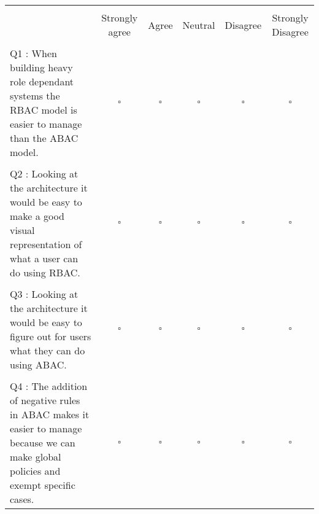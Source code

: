 \hskip-2.8cm\begin{tabular}{p{5cm} c c c c c}
    \multicolumn{6}{c}{} \\        
    & Strongly agree & Agree & Neutral  & Disagree & Strongly Disagree \\ 
    \\
    Q1 : When building heavy role dependant systems the RBAC model is easier to manage than the ABAC model. & $\square$ & $\square$ & $\square$ & $\square$ & $\square$ \\
    \\
    Q2 : Looking at the architecture it would be easy to make a good visual representation of what a user can do using RBAC.
    & $\square$ & $\square$ & $\square$ & $\square$ & $\square$\\
    \\
    Q3 : Looking at the architecture it would be easy to figure out for users what they can do using ABAC.
    & $\square$ & $\square$ & $\square$ & $\square$ & $\square$\\
    \\
    Q4 : The addition of negative rules in ABAC makes it easier to manage because we can make global policies and exempt specific cases.
    & $\square$ & $\square$ & $\square$ & $\square$ & $\square$\\
\end{tabular}

